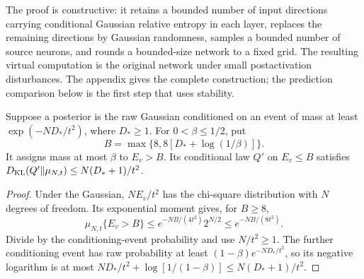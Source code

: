 The proof is constructive: it retains a bounded number of input directions
carrying conditional Gaussian relative entropy in each layer, replaces the
remaining directions by Gaussian randomness, samples a bounded number of
source neurons, and rounds a bounded-size network to a fixed grid.
The resulting virtual computation is the original network under small
postactivation disturbances. The appendix gives the complete construction;
the prediction comparison below is the first step that uses stability.

\begin{lemma}
\label{lem:standalone-readout-tail}
Suppose a posterior is the raw Gaussian conditioned on an event of mass at
least $\exp(-ND_*/t^2)$, where $D_*\ge1$. For $0<\beta\le1/2$, put
\[
 B=\max\{8,8[D_*+\log(1/\beta)]\}.
\]
It assigns mass at most $\beta$ to $E_v>B$. Its conditional law $Q'$ on
$E_v\le B$ satisfies
$D_{\rm KL}(Q'\Vert\mu_{N,t})\le N(D_*+1)/t^2$.
\end{lemma}
\begin{proof}
Under the Gaussian, $NE_v/t^2$ has the chi-square distribution with $N$
degrees of freedom. Its exponential moment gives, for $B\ge8$,
\[
 \mu_{N,t}\{E_v>B\}
 \le e^{-NB/(4t^2)}2^{N/2}
 \le e^{-NB/(8t^2)}.
\]
Divide by the conditioning-event probability and use $N/t^2\ge1$.
The further conditioning event has raw probability at least
$(1-\beta)e^{-ND_*/t^2}$, so its negative logarithm is at most
$ND_*/t^2+\log[1/(1-\beta)]\le N(D_*+1)/t^2$.
\end{proof}

